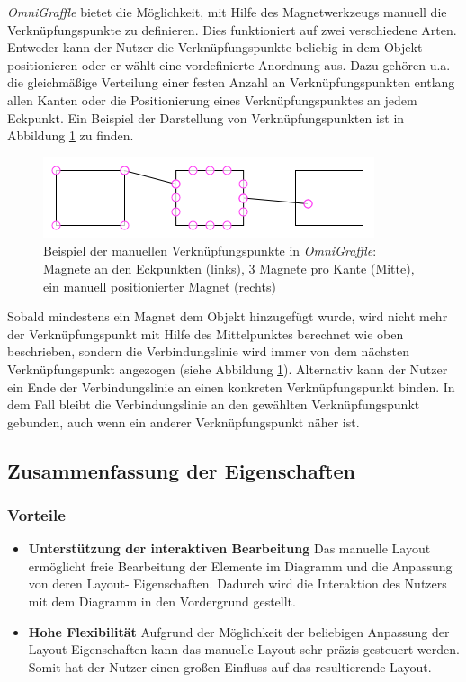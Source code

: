 \textit{OmniGraffle} bietet die Möglichkeit, mit Hilfe des Magnetwerkzeugs manuell die Verknüpfungspunkte zu definieren. Dies funktioniert auf zwei verschiedene Arten. Entweder kann der Nutzer die Verknüpfungspunkte beliebig in dem Objekt positionieren oder er wählt eine vordefinierte Anordnung aus. Dazu gehören u.a. die gleichmäßige Verteilung einer festen Anzahl an Verknüpfungspunkten entlang allen Kanten oder die Positionierung eines Verknüpfungspunktes an jedem Eckpunkt. Ein Beispiel der Darstellung von Verknüpfungspunkten ist in Abbildung \ref{fig:omnigraffle-magnets-example} zu finden.

\begin{figure}[hbt]
    \centering
    \includegraphics{resources/omnigraffle-magnets-example.png}
    \caption{Beispiel der manuellen Verknüpfungspunkte in \textit{OmniGraffle}: Magnete an den Eckpunkten (links), 3 Magnete pro Kante (Mitte), ein manuell positionierter Magnet (rechts)}
    \label{fig:omnigraffle-magnets-example}
\end{figure}

Sobald mindestens ein Magnet dem Objekt hinzugefügt wurde, wird nicht mehr der Verknüpfungspunkt mit Hilfe des Mittelpunktes berechnet wie oben beschrieben, sondern die Verbindungslinie wird immer von dem nächsten Verknüpfungspunkt angezogen (siehe Abbildung \ref{fig:omnigraffle-magnets-example}). Alternativ kann der Nutzer ein Ende der Verbindungslinie an einen konkreten Verknüpfungspunkt binden. In dem Fall bleibt die Verbindungslinie an den gewählten Verknüpfungspunkt gebunden, auch wenn ein anderer Verknüpfungspunkt näher ist.

\subsection{Zusammenfassung der Eigenschaften}

\subsubsection{Vorteile}

\begin{itemize}

\item
\textbf{Unterstützung der interaktiven Bearbeitung}
Das manuelle Layout ermöglicht freie Bearbeitung der Elemente im Diagramm und die Anpassung von deren Layout- Eigenschaften. Dadurch wird die Interaktion des Nutzers mit dem Diagramm in den Vordergrund gestellt.

\item
\textbf{Hohe Flexibilität}
Aufgrund der Möglichkeit der beliebigen Anpassung der Layout-Ei\-gen\-schaften kann das manuelle Layout sehr präzis gesteuert werden. Somit hat der Nutzer einen großen Einfluss auf das resultierende Layout.

\end{itemize}

